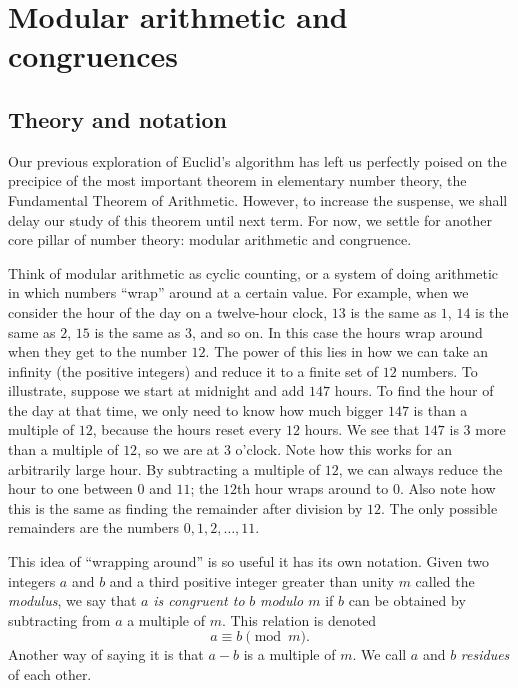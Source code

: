 
\twocolumn
\section{Modular arithmetic and congruences}
\subsection{Theory and notation}
Our previous exploration of Euclid's algorithm has left us
perfectly poised on the precipice of the most important theorem
in elementary number theory, the Fundamental Theorem of Arithmetic.
However, to increase the suspense, we shall delay our study of
this theorem until next term. For now, we settle for another
core pillar of number theory: modular arithmetic and congruence.

Think of modular arithmetic as cyclic counting, or a system of
doing arithmetic in which numbers ``wrap'' around at a certain value. For example, when we consider
the hour of the day on a twelve-hour clock, $13$ is the same as $1$,  $14$
is the same as $2$, $15$ is the same as $3$, and so on. In this case the hours wrap around when they get
to the number $12$. The power of this lies in how we can take an infinity
(the positive integers) and reduce it to a finite set of $12$ numbers. To illustrate,
suppose we start at midnight and add $147$ hours. To find the hour of the day at that time,
we only need to know how much bigger $147$ is than a multiple of $12$, because the
hours reset every $12$ hours. We see that $147$ is $3$ more than a multiple of $12$, so
we are at $3$ o'clock. Note how this works for an arbitrarily large hour. By subtracting
a multiple of $12$, we can always reduce the hour to one between $0$ and $11$; the $12$th
hour wraps around to $0$. Also note how this is the same as finding the remainder
after division by $12$. The only possible remainders are the numbers $0,1,2,\ldots,11$.

This idea of ``wrapping around'' is so useful it has its own notation. Given two integers
$a$ and $b$ and a third positive integer greater than unity $m$ called the \emph{modulus},
we say that $a$ \emph{is congruent to} $b$ \emph{modulo $m$} if $b$ can be obtained
by subtracting from $a$ a multiple of $m$. This relation is denoted \[a\equiv b\pmod{m}.\]
Another way of saying it is that $a-b$ is a multiple of $m$. We call \(a\) and \(b\)
\emph{residues} of each other.

